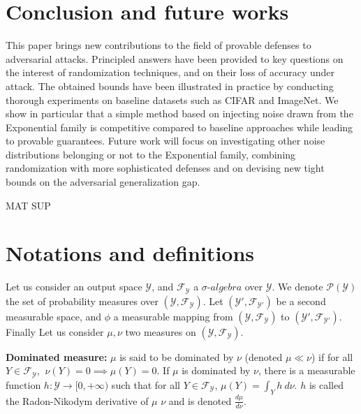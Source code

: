 \section{Conclusion and future works}
\label{section:ap3-conclusion}

This paper brings new contributions to the field of provable defenses to adversarial attacks. Principled answers have been provided to key questions on the interest of randomization techniques, and on their loss of accuracy under attack. The obtained bounds have been illustrated in practice by conducting thorough experiments on baseline datasets such as CIFAR and ImageNet. We show in particular that a simple method based on injecting noise drawn from the Exponential family is competitive compared to baseline approaches while leading to provable guarantees. Future work will focus on investigating other noise distributions belonging or not to the Exponential family, combining randomization with more sophisticated defenses and on devising new tight bounds on the adversarial generalization gap.


\begin{Large}
MAT SUP
\end{Large}

\section{Notations and definitions}

Let us consider an output space $\mathcal{Y}$, and $\mathcal{F}_{\mathcal{Y}}$ a $\sigma$-$ algebra$ over $\mathcal{Y}$. We denote $\mathcal{P}(\mathcal{Y})$ the set of probability measures over $(\mathcal{Y},\mathcal{F}_{\mathcal{Y}})$.
Let $(\mathcal{Y'},\mathcal{F}_{\mathcal{Y'}})$ be a second measurable space, and $\phi$ a measurable mapping from $(\mathcal{Y},\mathcal{F}_{\mathcal{Y}})$ to $(\mathcal{Y'},\mathcal{F}_{\mathcal{Y'}})$. Finally Let us consider $\mu,\nu$ two measures on $(\mathcal{Y},\mathcal{F}_{\mathcal{Y}})$.

\textbf{Dominated measure:} $\mu$ is said to be dominated by $\nu$ (denoted $\mu \ll \nu$) if for all $Y \in \mathcal{F}_{\mathcal{Y}}$, $\ \nu(Y) = 0 \implies \mu(Y)=0$. If $\mu$ is dominated by $\nu$, there is a measurable function $h : \mathcal{Y} \rightarrow [0,+\infty)$ such that for all $Y \in \mathcal{F}_{\mathcal{Y}}$, $ \mu(Y)=\int_{Y} h \ d\nu$. $ h $ is called the Radon-Nikodym derivative of $\mu$ \wrt $\nu$ and is denoted $\frac{d \mu}{d \nu}$.
   
